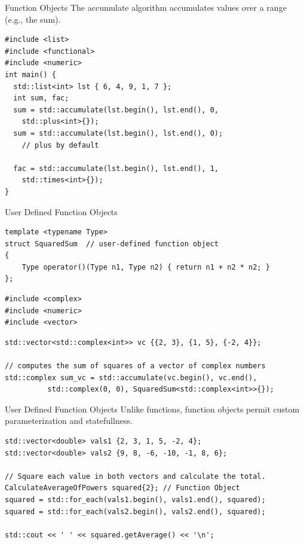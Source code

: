 \documentclass[14pt,aspectratio=1610]{beamer}
\begin{document}
\begin{frame}[fragile]{Function Objects}
\small
The accumulate algorithm accumulates values over a range (e.g., the sum).

\begin{lstlisting}[basicstyle=\small\ttfamily]
#include <list>
#include <functional>
#include <numeric>
int main() {
  std::list<int> lst { 6, 4, 9, 1, 7 };
  int sum, fac;
  sum = std::accumulate(lst.begin(), lst.end(), 0,
    std::plus<int>{});
  sum = std::accumulate(lst.begin(), lst.end(), 0);
    // plus by default

  fac = std::accumulate(lst.begin(), lst.end(), 1,
    std::times<int>{});
}
\end{lstlisting}
\end{frame}

\begin{frame}[fragile]{User Defined Function Objects}

\begin{lstlisting}[basicstyle=\footnotesize\ttfamily]
template <typename Type>
struct SquaredSum  // user-defined function object
{
    Type operator()(Type n1, Type n2) { return n1 + n2 * n2; }
};
\end{lstlisting}
\begin{lstlisting}[basicstyle=\footnotesize\ttfamily]
#include <complex>
#include <numeric>
#include <vector>
\end{lstlisting}
\begin{lstlisting}[basicstyle=\footnotesize\ttfamily]
std::vector<std::complex<int>> vc {{2, 3}, {1, 5}, {-2, 4}};

// computes the sum of squares of a vector of complex numbers
std::complex sum_vc = std::accumulate(vc.begin(), vc.end(),
          std::complex(0, 0), SquaredSum<std::complex<int>>{});
\end{lstlisting}
\end{frame}


\begin{frame}[fragile]{User Defined Function Objects}
Unlike functions, function objects permit custom parameterization and statefullness.

\begin{lstlisting}[basicstyle=\footnotesize\ttfamily]
std::vector<double> vals1 {2, 3, 1, 5, -2, 4};
std::vector<double> vals2 {9, 8, -6, -10, -1, 8, 6};

// Square each value in both vectors and calculate the total.
CalculateAverageOfPowers squared{2}; // Function Object
squared = std::for_each(vals1.begin(), vals1.end(), squared);
squared = std::for_each(vals2.begin(), vals2.end(), squared);

std::cout << ' ' << squared.getAverage() << '\n';
\end{lstlisting}
\end{frame}
\end{document}
